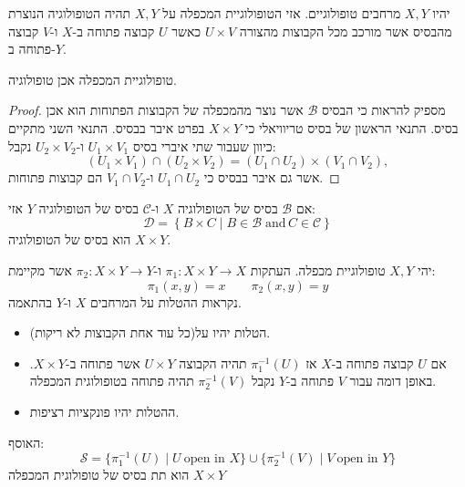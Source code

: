 \documentclass{tstextbook}
\begin{document}
\begin{definition}
יהיו \(X,Y\) מרחבים טופולוגיים. אזי הטופולוגיית המכפלה על \(X,Y\) תהיה הטופולוגיה הנוצרת מהבסיס אשר מורכב מכל הקבוצות מהצורה \(U\times V\) כאשר \(U\) קבוצה פתוחה ב-\(X\) ו-\(V\) קבוצה פתוחה ב-\(Y\).

\end{definition}
\begin{lemma}
טופולוגיית המכפלה אכן טופולוגיה.

\end{lemma}
\begin{proof}
מספיק להראות כי הבסיס \(\mathcal{B}\) אשר נוצר מהמכפלה של הקבוצות הפתוחות הוא אכן בסיס. התנאי הראשון של בסיס טריוויאלי כי \(X\times Y\) בפרט איבר בבסיס. התנאי השני מתקיים כיוון שעבור שתי איברי בסיס \(U_{1}\times V_{1}\) ו-\(U_{2}\times V_{2}\) נקבל:
$$(U_{1}\times V_{1})\cap(U_{2}\times V_{2})=(U_{1}\cap U_{2})\times(V_{1}\cap V_{2}),$$
אשר גם איבר בבסיס כי \(U_{1}\cap U_{2}\) ו-\(V_{1}\cap V_{2}\) הם קבוצות פתוחות.

\end{proof}
\begin{proposition}
אם \(\mathcal{B}\) בסיס של הטופולוגיה \(X\) ו-\(\mathcal{C}\) בסיס של הטופולוגיה \(Y\) אזי:
$${\mathcal{D}}=\left\{ B\times C\mid B\in{\mathcal{B}}\;\text{and}\,C\in{\mathcal{C}} \right\}$$
הוא בסיס של הטופולוגיה \(X\times Y\).

\end{proposition}
\begin{definition}
יהי \(X,Y\) טופולוגיית מכפלה. העתקות \(\pi_{1}:X\times Y\to X\) ו-\(\pi_{2}:X\times Y\to Y\) אשר מקיימת:
$$\pi_{1}(x,y)=x\qquad \pi_{2}(x,y)=y$$
נקראות ההטלות על המרחבים \(X\) ו-\(Y\) בהתאמה.

\end{definition}
\begin{proposition}
  \begin{itemize}
    \item הטלות יהיו על(כל עוד אחת הקבוצות לא ריקות).
    \item אם \(U\) קבוצה פתוחה ב-\(X\) אז \(\pi_{1}^{-1}(U)\) תהיה הקבוצה \(U\times Y\) אשר פתוחה ב-\(X\times Y\). באופן דומה עבור \(V\) פתוחה ב-\(Y\) נקבל \(\pi_{2}^{-1}(V)\) תהיה פתוחה בטופולוגית המכפלה.
    \item ההטלות יהיו פונקציות רציפות.
  \end{itemize}
\end{proposition}
\begin{proposition}
האוסף:
$${\mathcal{S}}=\{{\pi}_{1}^{-1}(U)\mid U\ \text{open in } X\}\cup\{{\pi}_{2}^{-1}(V)\mid V\ \text{open in } Y\}$$
הוא תת בסיס של טופולוגית המכפלה \(X\times Y\)

\end{proposition}
\end{document}
